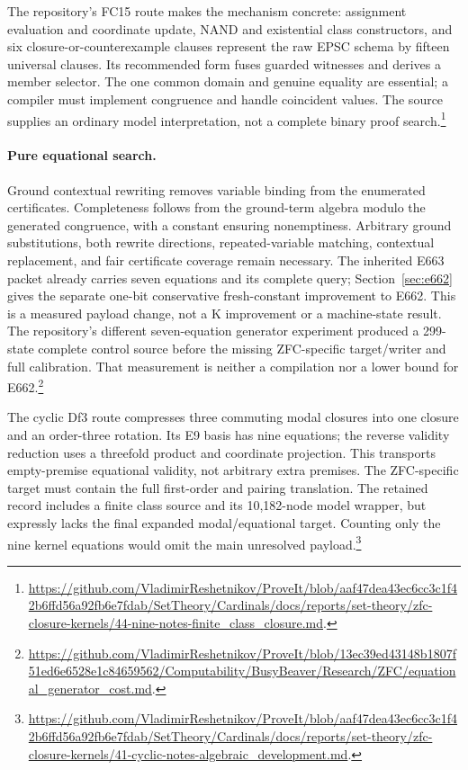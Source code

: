 The repository's FC15 route makes the mechanism concrete: assignment
evaluation and coordinate update, NAND and existential class
constructors, and six closure-or-counterexample clauses represent
the raw EPSC schema by fifteen universal clauses.  Its recommended
form fuses guarded witnesses and derives a member selector.
The one common domain and genuine equality are essential; a compiler
must implement congruence and handle coincident values.  The source
supplies an ordinary model interpretation, not a complete binary
proof search.\footnote{
\url{https://github.com/VladimirReshetnikov/ProveIt/blob/aaf47dea43ec6cc3c1f42b6ffd56a92fb6e7fdab/SetTheory/Cardinals/docs/reports/set-theory/zfc-closure-kernels/44-nine-notes-finite_class_closure.md}.}

\paragraph{Pure equational search.}
Ground contextual rewriting removes variable binding from the
enumerated certificates.  Completeness follows from the ground-term
algebra modulo the generated congruence, with a constant ensuring
nonemptiness.  Arbitrary ground substitutions, both rewrite
directions, repeated-variable matching, contextual replacement, and
fair certificate coverage remain necessary.  The inherited E663
packet already carries seven equations and its complete query;
Section~\ref{sec:e662} gives the separate one-bit conservative
fresh-constant improvement to E662.  This is a measured payload
change, not a K improvement or a machine-state result.
The repository's different seven-equation generator experiment
produced a 299-state complete control source before the missing
ZFC-specific target/writer and full calibration.  That measurement
is neither a compilation nor a lower bound for E662.\footnote{
\url{https://github.com/VladimirReshetnikov/ProveIt/blob/13ec39ed43148b1807f51ed6e6528e1c84659562/Computability/BusyBeaver/Research/ZFC/equational_generator_cost.md}.}

The cyclic Df3 route compresses three commuting modal closures into
one closure and an order-three rotation.  Its E9 basis has nine
equations; the reverse validity reduction uses a threefold product
and coordinate projection.  This transports empty-premise
equational validity, not arbitrary extra premises.  The ZFC-specific
target must contain the full first-order and pairing translation.
The retained record includes a finite class source and its
10,182-node model wrapper, but expressly lacks the final expanded
modal/equational target.  Counting only the nine kernel equations
would omit the main unresolved payload.\footnote{
\url{https://github.com/VladimirReshetnikov/ProveIt/blob/aaf47dea43ec6cc3c1f42b6ffd56a92fb6e7fdab/SetTheory/Cardinals/docs/reports/set-theory/zfc-closure-kernels/41-cyclic-notes-algebraic_development.md}.}

